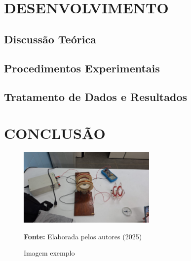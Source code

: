 \documentclass[a4paper,12pt]{article}
\begin{document}
\lipsum[1-3]

\newpage
\section{DESENVOLVIMENTO}
\label{sec:desenvolvimento}

\lipsum[1]

\subsection{Discussão Teórica}
\label{subsec:discussao_teorica}

\lipsum[1-3]

\subsection{Procedimentos Experimentais}
\label{subsec:procedimentos_experimentais}

\lipsum[1-2]

\subsection{Tratamento de Dados e Resultados}
\label{subsec:discussao_teorica}

\lipsum[1-2]

\newpage
\section{CONCLUSÃO}
\label{sec:conclusao}

\lipsum[1-2]

\begin{figure}[H]
\centering
\caption{Imagem exemplo}
\includegraphics[width=0.6\textwidth]{experimento.jpg}
\label{fig:carga_capacitor}
\par\vspace{0.5em}
{\footnotesize\textbf{Fonte:} Elaborada pelos autores (2025)}
\end{figure}


\newpage
{}  %
\end{document}
